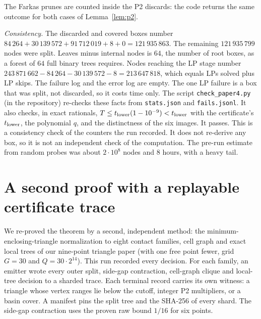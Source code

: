 \documentclass[11pt]{amsart}
\theoremstyle{definition}
\begin{document}
The Farkas prunes are counted inside the P2 discards: the code returns the same outcome for both cases of Lemma~\ref{lem:p2}. %

\emph{Consistency.} The discarded and covered boxes number $84\,264 + 30\,139\,572 + 91\,712\,019 + 8 + 0 = 121\,935\,863$. The remaining $121\,935\,799$ nodes were split. Leaves minus internal nodes is $64$, the number of root boxes, as a forest of $64$ full binary trees requires. Nodes reaching the LP stage number $243\,871\,662 - 84\,264 - 30\,139\,572 - 8 = 213\,647\,818$, which equals LPs solved plus LP skips. The failure log and the error log are empty. The one LP failure is a box that was split, not discarded, so it costs time only. The script \texttt{check\_paper4.py} (in the repository) re-checks these facts from \texttt{stats.json} and \texttt{fails.jsonl}. It also checks, in exact rationals, $T \le t_{\rm lower}(1-10^{-9}) < t_{\rm lower}$ with the certificate's $t_{\rm lower}$, the polynomial $q$, and the distinctness of the six images. It passes. This is a consistency check of the counters the run recorded. It does not re-derive any box, so it is not an independent check of the computation. %
The pre-run estimate from random probes was about $2\cdot10^8$ nodes and $8$ hours, with a heavy tail. %

\section{A second proof with a replayable certificate trace}\label{sec:trace}
We re-proved the theorem by a second, independent method: the minimum-enclosing-triangle normalization to eight contact families, cell graph and exact local trees of our nine-point triangle paper \cite{Tri9} (with one free point fewer, grid $G = 30$ and $Q = 30\cdot2^{14}$). This run recorded every decision. For each family, an emitter wrote every outer split, side-gap contraction, cell-graph clique and local-tree decision to a sharded trace. Each terminal record carries its own witness: a triangle whose vertex ranges lie below the cutoff, integer P2 multipliers, or a basin cover. A manifest pins the split tree and the SHA-256 of every shard. The side-gap contraction uses the proven raw bound $1/16$ for six points.
\end{document}
